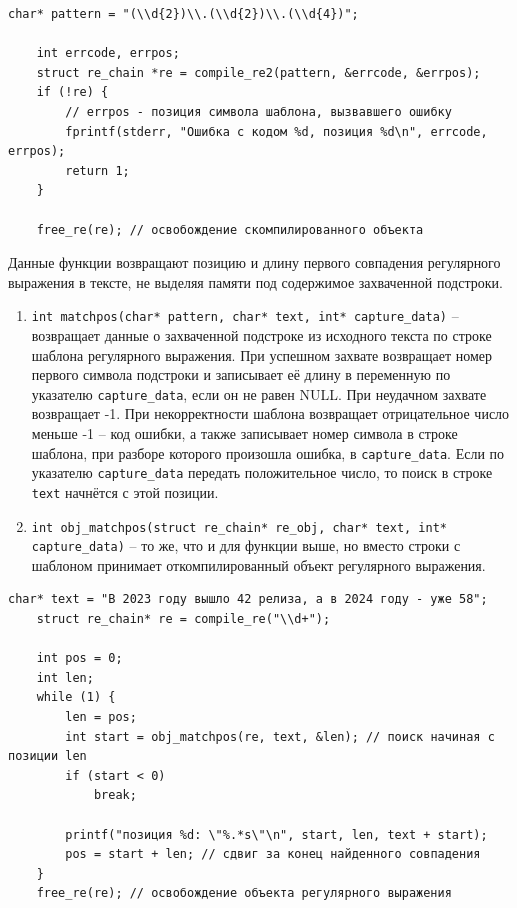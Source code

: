 \begin{lstlisting}[caption={Пример компиляции шаблона с диагностикой ошибок}]
	char* pattern = "(\\d{2})\\.(\\d{2})\\.(\\d{4})";

	int errcode, errpos;
	struct re_chain *re = compile_re2(pattern, &errcode, &errpos);
	if (!re) {
		// errpos - позиция символа шаблона, вызвавшего ошибку
		fprintf(stderr, "Ошибка с кодом %d, позиция %d\n", errcode, errpos);
		return 1;
	}

	free_re(re); // освобождение скомпилированного объекта
\end{lstlisting}


Данные функции возвращают позицию и длину первого совпадения регулярного выражения в тексте, не выделяя памяти под содержимое захваченной подстроки.

\begin{enumerate}
	\item \verb`int matchpos(char* pattern, char* text, int* capture_data)` -- возвращает данные о захваченной подстроке из исходного текста по строке шаблона регулярного выражения. При успешном захвате возвращает номер первого символа подстроки и записывает её длину в переменную по указателю \verb`capture_data`, если он не равен NULL. При неудачном захвате возвращает -1. При некорректности шаблона возвращает отрицательное число меньше -1 -- код ошибки, а также записывает номер символа в строке шаблона, при разборе которого произошла ошибка, в \verb`capture_data`. Если по указателю \verb`capture_data` передать положительное число, то поиск в строке \verb`text` начнётся с этой позиции.
	
	\item \verb`int obj_matchpos(struct re_chain* re_obj, char* text, int* capture_data)` -- то же, что и для функции выше, но вместо строки с шаблоном принимает откомпилированный объект регулярного выражения.
\end{enumerate}


\begin{lstlisting}[caption={Последовательный проход по всем совпадениям в тексте}]
	char* text = "В 2023 году вышло 42 релиза, а в 2024 году - уже 58";
	struct re_chain* re = compile_re("\\d+");
	
	int pos = 0;
	int len;
	while (1) {
		len = pos;
		int start = obj_matchpos(re, text, &len); // поиск начиная с позиции len
		if (start < 0)
			break;
		
		printf("позиция %d: \"%.*s\"\n", start, len, text + start);
		pos = start + len; // сдвиг за конец найденного совпадения
	}
	free_re(re); // освобождение объекта регулярного выражения
\end{lstlisting}

